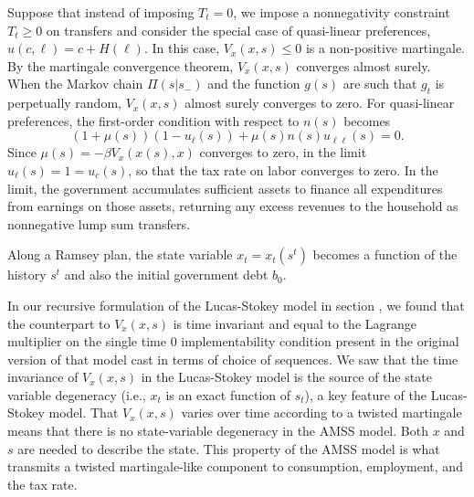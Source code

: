 \medskip

  Suppose that instead of imposing $T_t = 0$, we impose
a nonnegativity constraint $T_t\geq 0$ on  transfers and consider the special case of quasi-linear preferences,
$u(c,\ell)= c + H(\ell)$.   In this case,  $V_x(x,s)\leq 0$  is a non-positive martingale.  By the martingale convergence
 theorem, $V_x(x,s)$ converges almost surely.
%
When  the Markov chain $\Pi(s| s_-)$ and the function $g(s)$ are such that $g_t$ is perpetually random,
$V_x(x, s)$ almost surely converges to zero.  %
For  quasi-linear preferences, the first-order condition with respect to $n(s)$ becomes
$$ (1+\mu(s) ) (1 - u_\ell(s)) + \mu(s) n(s) u_{\ell \ell}(s) =0  .$$
Since $\mu(s) = - \beta V_x(x(s),x) $ converges to zero, in the limit $u_\ell(s)= 1 =u_c(s)$, so that 
the tax rate on labor converges to zero. In the limit, the government
accumulates sufficient assets
to finance all expenditures from earnings on those assets, returning any excess revenues to the household as nonnegative lump sum transfers.

\medskip


 Along a Ramsey plan, the state variable $x_t = x_t(s^t)$  becomes a function of the history $s^t$ and also
the initial government debt $b_0$.


\medskip

 In our recursive formulation of the  Lucas-Stokey model in section , we found that the counterpart to $V_x(x,s)$ is time invariant
and equal to
the Lagrange multiplier on the single time $0$ implementability condition present in the original version of that model cast in terms of choice of sequences.
We saw that the time invariance of $V_x(x,s)$ in the Lucas-Stokey model is the source of the state variable degeneracy (i.e., $x_t$ is an exact function of
$s_t$), a key feature of the Lucas-Stokey model.
That $V_x(x,s)$ varies over time according to a twisted martingale means that there is no state-variable degeneracy in the AMSS model.
Both $x$ and $s$ are needed to describe the state.  This property of the
AMSS model is what transmits a twisted martingale-like component  to consumption, employment, and the tax rate.
\medskip


